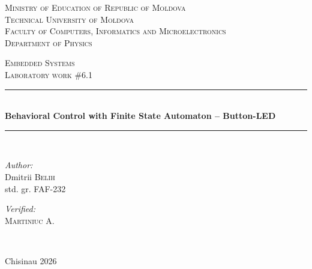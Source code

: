 \documentclass[12pt]{article}
\begin{document}
\begin{titlepage}
    \thispagestyle{empty}

    \begin{center}
        \textsc{\large Ministry of Education of Republic of Moldova}\\[0.5cm]
        \textsc{\large Technical University of Moldova}\\[0.5cm]
        \textsc{\large Faculty of Computers, Informatics and Microelectronics}\\[0.5cm]
        \textsc{\large Department of Physics}\\[1.2cm]
    \end{center}

    \vspace{25mm}

    \begin{center}
        \textsc{\Large Embedded Systems}\\[0.5cm]
        \textsc{\large Laboratory work \#6.1}\\[0.5cm]

        \newcommand{\HRule}{\rule{\linewidth}{0.5mm}}
        \vspace{10mm}
        \HRule \\[0.4cm]
        { \LARGE \bfseries Behavioral Control with Finite State Automaton – Button-LED}\\[0.4cm]
        \HRule \\[1.5cm]
    \end{center}

    \vspace{10mm}

    \begin{minipage}[t]{0.4\textwidth}
        \begin{flushleft} \large
            \emph{Author:} \\
            Dmitrii \textsc{Belih}\\
            std. gr. FAF-232
        \end{flushleft}
    \end{minipage}
    \hfill
    \begin{minipage}[t]{0.4\textwidth}
        \begin{flushright} \large
            \emph{Verified:} \\
            \textsc{Martiniuc} A.\\
        \end{flushright}
    \end{minipage}\\[3cm]

    \vspace{5mm}
    \begin{center}
        \large Chisinau 2026 \\[0.5cm]
    \end{center}

    \vfill
\end{titlepage}
\end{document}
